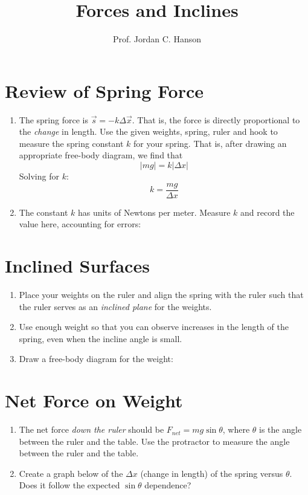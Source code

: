 \documentclass{article}
\begin{document}
\twocolumn

\title{Forces and Inclines}
\author{Prof. Jordan C. Hanson}

\maketitle

\section{Review of Spring Force}
\begin{enumerate}
\item The spring force is $\vec{s} = -k\Delta \vec{x}$.  That is, the force is directly proportional to the \textit{change} in length.  Use the given weights, spring, ruler and hook to measure the spring constant $k$ for your spring.  That is, after drawing an appropriate free-body diagram, we find that 
\begin{equation}
|mg| = k|\Delta x|
\end{equation}
Solving for $k$:
\begin{equation}
k = \frac{mg}{\Delta x}
\end{equation}
\item The constant $k$ has units of Newtons per meter.  Measure $k$ and record the value here, accounting for errors: \\ \vspace{1cm}
\end{enumerate}

\section{Inclined Surfaces}
\begin{enumerate}
\item Place your weights on the ruler and align the spring with the ruler such that the ruler serves as an \textit{inclined plane} for the weights.
\item Use enough weight so that you can observe increases in the length of the spring, even when the incline angle is small.
\item Draw a free-body diagram for the weight: \\ \vspace{4cm}
\end{enumerate}

\section{Net Force on Weight}
\begin{enumerate}
\item The net force \textit{down the ruler} should be $F_{net} = mg\sin\theta$, where $\theta$ is the angle between the ruler and the table.  Use the protractor to measure the angle between the ruler and the table.
\item Create a graph below of the $\Delta x$ (change in length) of the spring versus $\theta$.
Does it follow the expected $\sin\theta$ dependence? \\ \vspace{6cm}
\end{enumerate}
\end{document}

